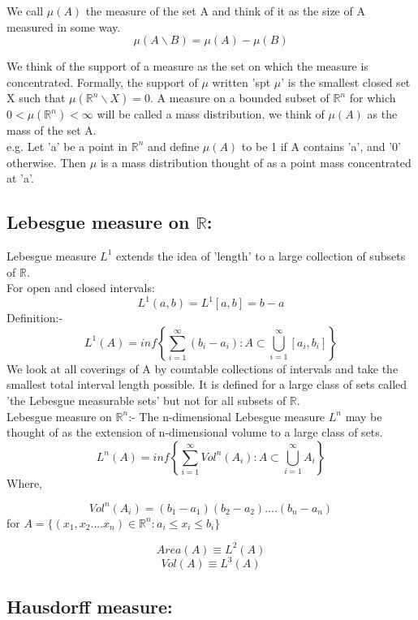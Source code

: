 \documentclass[14pt]{extarticle}
\begin{document}
We call $\mu(A)$ the measure of the set A and think of it as the size of A measured in some way.\\
$$\mu(A\backslash B)= \mu(A)-\mu(B)$$

We think of the support of a measure as the set on which the measure is concentrated. Formally, the support of $\mu$ written 'spt $\mu$' is the smallest closed set X such that $\mu(\mathbb{R}^n\backslash X)=0$.
A measure on a bounded subset of $\mathbb{R}^n$ for which $0< \mu(\mathbb{R}^n)<\infty$ will be called a mass distribution, we think of $\mu(A)$ as the mass of the set A.\\
e.g. Let 'a' be a point in $\mathbb{R}^n$ and define $\mu(A)$ to be 1 if A contains 'a', and '0' otherwise. Then $\mu$ is a mass distribution thought of as a point mass concentrated at 'a'.

\subsection{Lebesgue measure on $\mathbb{R}$:}

Lebesgue measure $L^1$ extends the idea of 'length' to a large collection of subsets of $\mathbb{R}$.\\
For open and closed intervals:
$$L^1(a,b)=L^1[a,b]=b-a$$
Definition:-\\
$$L^1(A)=inf\left\lbrace \sum_{i=1}^{\infty}(b_i-a_i): A \subset \bigcup_{i=1}^{\infty} [a_i,b_i] \right\rbrace$$
We look at all coverings of A by countable collections of intervals and take the smallest total interval length possible. It is defined for a large class of sets called 'the Lebesgue measurable sets' but not for all subsets of $\mathbb{R}$.\\
Lebesgue measure on $\mathbb{R}^n$:-
The n-dimensional Lebesgue measure $L^n$ may be thought of as the extension of n-dimensional volume to a large class of sets.\\

$$L^n(A)=inf\left\lbrace \sum_{i=1}^{\infty} Vol^n(A_i): A \subset \bigcup_{i=1}^{\infty} A_i \right\rbrace$$
Where,

$$Vol^n(A_i)=(b_1-a_1)(b_2-a_2)....(b_n-a_n)$$
for $A=\lbrace (x_1,x_2....x_n) \in \mathbb{R}^n : a_i \leq x_i \leq b_i \rbrace$

$$Area(A)\equiv L^2(A)$$
$$Vol(A)\equiv L^3(A)$$

\subsection{Hausdorff measure:}
\end{document}
